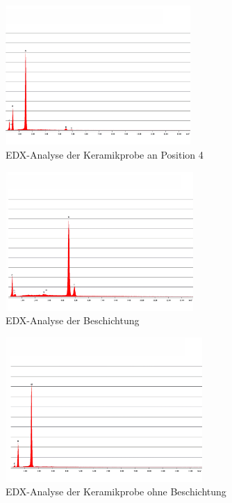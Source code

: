 \documentclass[12pt,english,ngerman]{scrartcl}
\begin{document}
\begin{figure}[H]
	\begin{center}
		\includegraphics[width =\textwidth,height=5.3cm]{./figures/edx4.png}
	\end{center}
	\caption{EDX-Analyse der Keramikprobe an Position 4~\cite{zankel_serie_nodate}
	}\label{fig:position4}
\end{figure}
\begin{figure}[H]
	\begin{center}
		\includegraphics[width =\textwidth,height=5.3cm]{./figures/beschichtung.png}
	\end{center}
	\caption{EDX-Analyse der Beschichtung~\cite{zankel_serie_nodate}
	}\label{fig:beschichtung}
\end{figure}
\begin{figure}[H]
	\begin{center}
		\includegraphics[width =\textwidth,height=5.5cm]{./figures/keramik.png}
	\end{center}
	\caption{EDX-Analyse der Keramikprobe ohne Beschichtung~\cite{zankel_serie_nodate}
	}\label{fig:keramik}
\end{figure}
\end{document}

